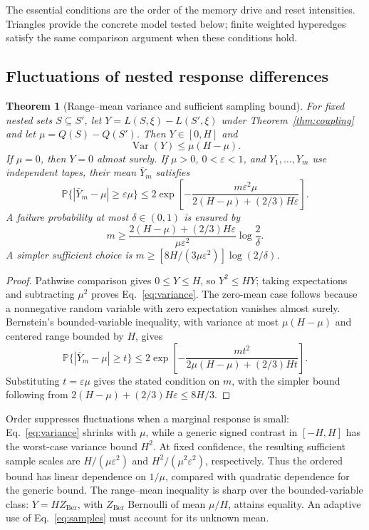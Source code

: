 \documentclass[final,5p,times,twocolumn,sort&compress]{elsarticle}
\theoremstyle{plain}
\newtheorem{theorem}{Theorem}
\newcommand{\Prob}{\mathbb{P}}
\newcommand{\Var}{\operatorname{Var}}
\begin{document}
The essential conditions are the order of the memory drive and reset intensities. Triangles provide the concrete model tested below; finite weighted hyperedges satisfy the same comparison argument when these conditions hold.

\subsection{Fluctuations of nested response differences}
\begin{theorem}[Range--mean variance and sufficient sampling bound]
\label{thm:variance}
For fixed nested sets $S\subseteq S'$, let
$Y=L(S,\xi)-L(S',\xi)$ under Theorem~\ref{thm:coupling} and let
$\mu=Q(S)-Q(S')$. Then $Y\in[0,H]$ and
\begin{equation}
 \Var(Y)\le\mu(H-\mu).\label{eq:variance}
\end{equation}
If $\mu=0$, then $Y=0$ almost surely. If $\mu>0$, $0<\varepsilon<1$, and $Y_1,\ldots,Y_m$ use independent tapes, their mean $\bar Y_m$ satisfies
\begin{equation}
 \Prob\{ |\bar Y_m-\mu|\ge\varepsilon\mu\}
 \le2\exp\!\left[-\frac{m\varepsilon^2\mu}
 {2(H-\mu)+(2/3)H\varepsilon}\right].\label{eq:relative}
\end{equation}
A failure probability at most $\delta\in(0,1)$ is ensured by
\begin{equation}
 m\ge\frac{2(H-\mu)+(2/3)H\varepsilon}{\mu\varepsilon^2}
       \log\frac2\delta.
 \label{eq:samples}
\end{equation}
A simpler sufficient choice is $m\ge[8H/(3\mu\varepsilon^2)]\log(2/\delta)$.
\end{theorem}
\begin{proof}
Pathwise comparison gives $0\le Y\le H$, so $Y^2\le HY$; taking expectations and subtracting $\mu^2$ proves Eq.~\ref{eq:variance}. The zero-mean case follows because a nonnegative random variable with zero expectation vanishes almost surely. Bernstein's bounded-variable inequality, with variance at most $\mu(H-\mu)$ and centered range bounded by $H$, gives
\[
 \Prob\{|\bar Y_m-\mu|\ge t\}
 \le2\exp\!\left[-\frac{mt^2}{2\mu(H-\mu)+(2/3)Ht}\right].
\]
Substituting $t=\varepsilon\mu$ gives the stated condition on $m$, with the simpler bound following from
$2(H-\mu)+(2/3)H\varepsilon\le8H/3$.
\end{proof}

Order suppresses fluctuations when a marginal response is small: Eq.~\ref{eq:variance} shrinks with $\mu$, while a generic signed contrast in $[-H,H]$ has the worst-case variance bound $H^2$. At fixed confidence, the resulting sufficient sample scales are $H/(\mu\varepsilon^2)$ and $H^2/(\mu^2\varepsilon^2)$, respectively. Thus the ordered bound has linear dependence on $1/\mu$, compared with quadratic dependence for the generic bound. The range--mean inequality is sharp over the bounded-variable class: $Y=H Z_{\mathrm{Ber}}$, with $Z_{\mathrm{Ber}}$ Bernoulli of mean $\mu/H$, attains equality. An adaptive use of Eq.~\ref{eq:samples} must account for its unknown mean.
\end{document}

